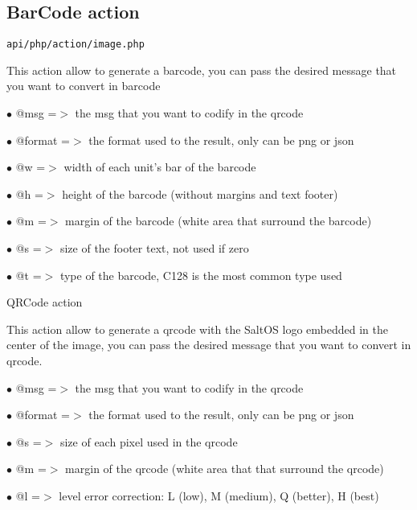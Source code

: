 \documentclass[a4paper]{article}
\begin{document}
\hypertarget{toc7}{}
\subsection{BarCode action}

\begin{lstlisting}
api/php/action/image.php
\end{lstlisting}

This action allow to generate a barcode, you can pass the desired
message that you want to convert in barcode

\begin{compactitem}
\item[\color{myblue}$\bullet$] @msg    =$>$ the msg that you want to codify in the qrcode
\item[\color{myblue}$\bullet$] @format =$>$ the format used to the result, only can be png or json
\end{compactitem}

\begin{compactitem}
\item[\color{myblue}$\bullet$] @w =$>$ width of each unit's bar of the barcode
\item[\color{myblue}$\bullet$] @h =$>$ height of the barcode (without margins and text footer)
\item[\color{myblue}$\bullet$] @m =$>$ margin of the barcode (white area that surround the barcode)
\item[\color{myblue}$\bullet$] @s =$>$ size of the footer text, not used if zero
\item[\color{myblue}$\bullet$] @t =$>$ type of the barcode, C128 is the most common type used
\end{compactitem}

QRCode action

This action allow to generate a qrcode with the SaltOS logo embedded
in the center of the image, you can pass the desired message that you
want to convert in qrcode.

\begin{compactitem}
\item[\color{myblue}$\bullet$] @msg    =$>$ the msg that you want to codify in the qrcode
\item[\color{myblue}$\bullet$] @format =$>$ the format used to the result, only can be png or json
\end{compactitem}

\begin{compactitem}
\item[\color{myblue}$\bullet$] @s =$>$ size of each pixel used in the qrcode
\item[\color{myblue}$\bullet$] @m =$>$ margin of the qrcode (white area that that surround the qrcode)
\item[\color{myblue}$\bullet$] @l =$>$ level error correction: L (low), M (medium), Q (better), H (best)
\end{compactitem}
\end{document}

